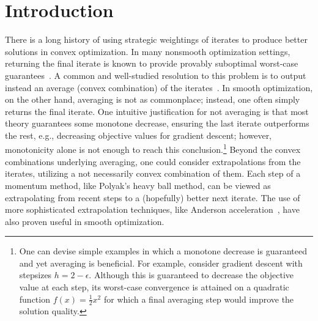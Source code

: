 \documentclass[11pt]{article}
\numberwithin{equation}{section}
\theoremstyle{definition}
\theoremstyle{definition}
\theoremstyle{definition}
\newcommand{\1}{\mathbf{1}}
\begin{document}
\section{Introduction} \label{Sect:Intro}
There is a long history of using strategic weightings of iterates to produce better solutions in convex optimization. In many nonsmooth optimization settings, returning the final iterate is known to provide provably suboptimal worst-case guarantees~\cite{NonsmoothLastIterate}. A common and well-studied resolution to this problem is to output instead an average (convex combination) of the iterates~\cite{grimmer2024primaldual,Gustavsson2015,NonsmoothOpt_Lan,Shamir2013}. In smooth optimization, on the other hand, averaging is not as commonplace; instead, one often simply returns the final iterate. One intuitive justification for not averaging is that most theory guarantees some monotone decrease, ensuring the last iterate outperforms the rest, e.g., decreasing objective values for gradient descent; however, monotonicity alone is not enough to reach this conclusion.\footnote{One can devise simple examples in which a monotone decrease is guaranteed and yet averaging is beneficial. For example, consider gradient descent with stepsizes $h=2-\epsilon$. Although this is guaranteed to decrease the objective value at each step, its worst-case convergence is attained on a quadratic function $f(x) = \frac{1}{2} x^2$ for which a final averaging step would improve the solution quality.} Beyond the convex combinations underlying averaging, one could consider extrapolations from the iterates, utilizing a not necessarily convex combination of them. Each step of a momentum method, like Polyak's heavy ball method, can be viewed as extrapolating from recent steps to a (hopefully) better next iterate. The use of more sophisticated extrapolation techniques, like Anderson acceleration~\cite{AndersonAccel,AndersonAccel_Recent}, have also proven useful in smooth optimization.
\end{document}
